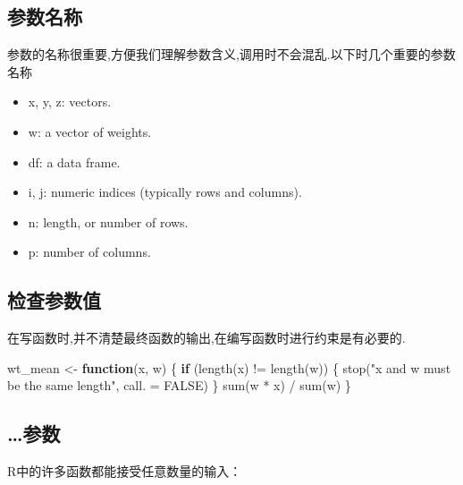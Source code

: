 \documentclass[
]{book}
\newenvironment{Shaded}{\begin{snugshade}}{\end{snugshade}}
\newcommand{\AttributeTok}[1]{\textcolor[rgb]{0.77,0.63,0.00}{#1}}
\newcommand{\ConstantTok}[1]{\textcolor[rgb]{0.00,0.00,0.00}{#1}}
\newcommand{\ControlFlowTok}[1]{\textcolor[rgb]{0.13,0.29,0.53}{\textbf{#1}}}
\newcommand{\FunctionTok}[1]{\textcolor[rgb]{0.00,0.00,0.00}{#1}}
\newcommand{\NormalTok}[1]{#1}
\newcommand{\OtherTok}[1]{\textcolor[rgb]{0.56,0.35,0.01}{#1}}
\newcommand{\SpecialCharTok}[1]{\textcolor[rgb]{0.00,0.00,0.00}{#1}}
\newcommand{\StringTok}[1]{\textcolor[rgb]{0.31,0.60,0.02}{#1}}
\providecommand{\tightlist}{%
  \setlength{\itemsep}{0pt}\setlength{\parskip}{0pt}}
\begin{document}
\hypertarget{ux53c2ux6570ux540dux79f0}{%
\subsection{参数名称}\label{ux53c2ux6570ux540dux79f0}}

参数的名称很重要,方便我们理解参数含义,调用时不会混乱.以下时几个重要的参数名称

\begin{itemize}
\tightlist
\item
  x, y, z: vectors.
\item
  w: a vector of weights.
\item
  df: a data frame.
\item
  i, j: numeric indices (typically rows and columns).
\item
  n: length, or number of rows.
\item
  p: number of columns.
\end{itemize}

\hypertarget{ux68c0ux67e5ux53c2ux6570ux503c}{%
\subsection{检查参数值}\label{ux68c0ux67e5ux53c2ux6570ux503c}}

在写函数时,并不清楚最终函数的输出,在编写函数时进行约束是有必要的.

\begin{Shaded}
\begin{Highlighting}[]
\NormalTok{wt\_mean }\OtherTok{\textless{}{-}} \ControlFlowTok{function}\NormalTok{(x, w) \{}
  \ControlFlowTok{if}\NormalTok{ (}\FunctionTok{length}\NormalTok{(x) }\SpecialCharTok{!=} \FunctionTok{length}\NormalTok{(w)) \{}
    \FunctionTok{stop}\NormalTok{(}\StringTok{"\textasciigrave{}x\textasciigrave{} and \textasciigrave{}w\textasciigrave{} must be the same length"}\NormalTok{, }\AttributeTok{call. =} \ConstantTok{FALSE}\NormalTok{)}
\NormalTok{  \}}
  \FunctionTok{sum}\NormalTok{(w }\SpecialCharTok{*}\NormalTok{ x) }\SpecialCharTok{/} \FunctionTok{sum}\NormalTok{(w)}
\NormalTok{\}}
\end{Highlighting}
\end{Shaded}

\hypertarget{ux53c2ux6570-1}{%
\subsection{\ldots 参数}\label{ux53c2ux6570-1}}

R中的许多函数都能接受任意数量的输入：
\end{document}

